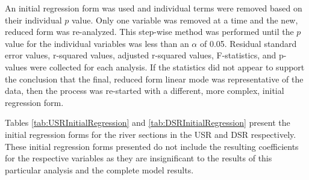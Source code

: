 An initial regression form was used and individual terms were removed based on their individual $p$ value.  Only one variable was removed at a time and the new, reduced form was re-analyzed.  This step-wise method was performed until the $p$ value for the individual variables was less than an $\alpha$ of 0.05.  Residual standard error values, r-squared values, adjusted r-squared values, F-statistics, and p-values were collected for each analysis.  If the statistics did not appear to support the conclusion that the final, reduced form linear mode was representative of the data, then the process was re-started with a different, more complex, initial regression form.


Tables \ref{tab:USRInitialRegression} and \ref{tab:DSRInitialRegression} present the initial regression forms for the river sections in the USR and DSR respectively. These initial regression forms presented do not include the resulting coefficients for the respective variables as they are insignificant to the results of this particular analysis and the complete model results. 

